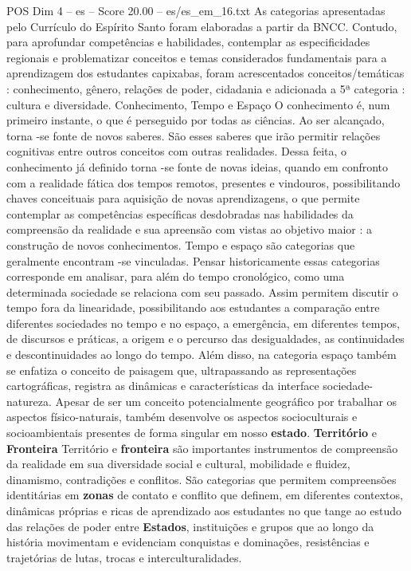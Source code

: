 \begin{textsample}{POS Dim 4 – es – Score 20.00 – es/es\_em\_16.txt}
As categorias apresentadas pelo Currículo do Espírito Santo foram elaboradas a partir da BNCC.
Contudo, para aprofundar competências e habilidades, contemplar as especificidades regionais e problematizar conceitos e temas considerados fundamentais para a aprendizagem dos estudantes capixabas, foram acrescentados conceitos/temáticas : conhecimento, gênero, relações de poder, cidadania e adicionada a 5ª categoria : cultura e diversidade.
Conhecimento, Tempo e Espaço O conhecimento é, num primeiro instante, o que é perseguido por todas as ciências.
Ao ser alcançado, torna -se fonte de novos saberes.
São esses saberes que irão permitir relações cognitivas entre outros conceitos com outras realidades.
Dessa feita, o conhecimento já definido torna -se fonte de novas ideias, quando em confronto com a realidade fática dos tempos remotos, presentes e vindouros, possibilitando chaves conceituais para aquisição de novas aprendizagens, o que permite contemplar as competências específicas desdobradas nas habilidades da compreensão da realidade e sua apreensão com vistas ao objetivo maior : a construção de novos conhecimentos.
Tempo e espaço são categorias que geralmente encontram -se vinculadas.
Pensar historicamente essas categorias corresponde em analisar, para além do tempo cronológico, como uma determinada sociedade se relaciona com seu passado.
Assim permitem discutir o tempo fora da linearidade, possibilitando aos estudantes a comparação entre diferentes sociedades no tempo e no espaço, a emergência, em diferentes tempos, de discursos e práticas, a origem e o percurso das desigualdades, as continuidades e descontinuidades ao longo do tempo.
Além disso, na categoria espaço também se enfatiza o conceito de paisagem que, ultrapassando as representações cartográficas, registra as dinâmicas e características da interface sociedade-natureza.
Apesar de ser um conceito potencialmente geográfico por trabalhar os aspectos físico-naturais, também desenvolve os aspectos socioculturais e socioambientais presentes de forma singular em nosso \textbf{estado}. \textbf{Território} e \textbf{Fronteira} Território e \textbf{fronteira} são importantes instrumentos de compreensão da realidade em sua diversidade social e cultural, mobilidade e fluidez, dinamismo, contradições e conflitos.
São categorias que permitem compreensões identitárias em \textbf{zonas} de contato e conflito que definem, em diferentes contextos, dinâmicas próprias e ricas de aprendizado aos estudantes no que tange ao estudo das relações de poder entre \textbf{Estados}, instituições e grupos que ao longo da história movimentam e evidenciam conquistas e dominações, resistências e trajetórias de lutas, trocas e interculturalidades.

\end{textsample}
